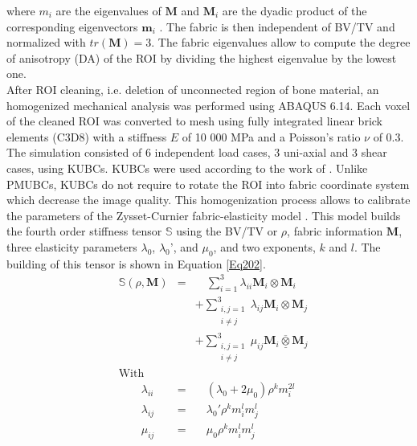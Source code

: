 \documentclass[a4paper,fleqn]{DC_ArtStyle}
\begin{document}
where $m_i$ are the eigenvalues of $\mathbf{M}$ and $\mathbf{M}_i$ are the dyadic product of the corresponding eigenvectors $\mathbf{m}_i$ \cite{Cowin1985,Harrigan1985}. The fabric is then independent of BV/TV and normalized with $tr(\mathbf{M}) = 3$. The fabric eigenvalues allow to compute the degree of anisotropy (DA) of the ROI by dividing the highest eigenvalue by the lowest one.\\

After ROI cleaning, i.e. deletion of unconnected region of bone material, an homogenized mechanical analysis was performed using \textsc{ABAQUS 6.14}. Each voxel of the cleaned ROI was converted to mesh using fully integrated linear brick elements (C3D8) with a stiffness $E$ of 10 000 MPa and a Poisson's ratio $\nu$ of 0.3. The simulation consisted of 6 independent load cases, 3 uni-axial and 3 shear cases, using KUBCs. KUBCs were used according to the work of \citeauthor{Panyasantisuk2015}\cite{Panyasantisuk2015}. Unlike PMUBCs, KUBCs do not require to rotate the ROI into fabric coordinate system which decrease the image quality. This homogenization process allows to calibrate the parameters of the Zysset-Curnier fabric-elasticity model \cite{Zysset1995}. This model builds the fourth order stiffness tensor $\mathbb{S}$ using the BV/TV or $\rho$, fabric information $\mathbf{M}$, three elasticity parameters $\lambda_0$, $\lambda_0$', and $\mu_0$, and two exponents, $k$ and $l$. The building of this tensor is shown in Equation \ref{Eq202}.\\

\begin{equation}
	\begin{split}
		&\mathbb{S}(\rho,\mathbf{M}) &=& \quad\sum_{i=1}^{3} \lambda_{ii} \mathbf{M}_i \otimes \mathbf{M}_i \\ &&&+ \sum_{\substack{i,j=1\\i \neq j}}^{3} \lambda_{ij} \mathbf{M}_i \otimes \mathbf{M}_j \\ &&&+ \sum_{\substack{i,j=1\\i \neq j}}^{3} \mu_{ij} \mathbf{M}_i \overline{\underline{\otimes}} \mathbf{M}_j \\
		&\text{With} &\\
		&\qquad\lambda_{ii} &=& \quad(\lambda_0 + 2\mu_0)\rho^k m_i^{2l} \\
		&\qquad\lambda_{ij} &=& \quad\lambda_0' \rho^k m_i^{l} m_j^{l} \\
		&\qquad\mu_{ij} &=& \quad\mu_0 \rho^k m_i^{l} m_j^{l} \\
	\end{split}
	\label{Eq202}
\end{equation}
\end{document}
